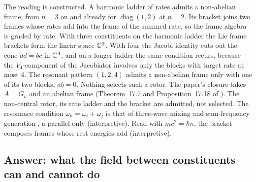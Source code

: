 The reading is constructed. A harmonic ladder of rates admits a non-abelian frame, from $n=3$ on and already for $\operatorname{diag}(1,2)$ at $n=2$. Its
bracket joins two frames whose rates add into the frame of the summed rate, so the frame algebra is graded by rate. With three constituents
on the harmonic ladder the Lie frame brackets form the linear space $\mathbb{C}^2$. With four the Jacobi identity cuts out the cone $ad=bc$ in $\mathbb{C}^4$, and
on a longer ladder the same condition recurs, because the $V_4$-component of the Jacobiator involves only the blocks with target rate at most
$4$. The resonant pattern $(1,2,4)$ admits a non-abelian frame only with one of its two blocks, $ab=0$. Nothing selects such a rotor. The paper's closure takes $A=G_n$ and an abelian frame
(Theorem~17.7 and Proposition~17.18 of \cite{ES17}). The non-central rotor, its rate ladder and the bracket are admitted, not selected. The
resonance condition $\omega_k=\omega_i+\omega_j$ is that of three-wave mixing and sum-frequency generation \cite{Armstrong62}, a parallel only
(interpretive). Read with $mc^2=\hbar\kappa$, the bracket composes frames whose rest energies add (interpretive).

\subsection{Answer: what the field between constituents can and cannot do}
\label{e4:sec:answer}


